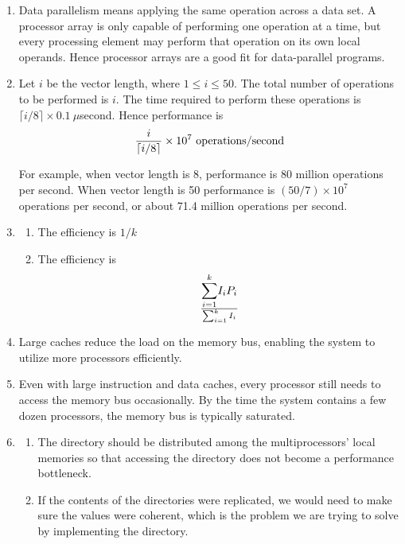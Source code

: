 \begin{enumerate}
\item Data parallelism means applying the same operation across a data set.
      A processor array is only capable of performing one operation at a time,
      but every processing element may perform that operation on its own
      local operands. Hence processor arrays are a good fit for 
      data-parallel programs.

\item Let $i$ be the vector length, where $1 \le i \le 50$.
      The total number of operations to be performed is $i$.
      The time required to perform these operations is
      $\lceil i/8\rceil\times 0.1\ \mu$second.
      Hence performance is
      $${{i}\over{\lceil i/8\rceil}}\times 10^7\ {\rm operations/second}$$

      For example, when vector length is 8, performance is
      80 million operations per second.
      When vector length is 50 performance is $(50/7)\times 10^7$ operations
      per second, or about 71.4 million operations per second.

\item \begin{enumerate}
      \item The efficiency is $1/k$
      \item The efficiency is
            $${\sum_{i=1}^k} I_i P_i\over{\sum_{i=1}^k I_i}$$
      \end{enumerate}

\item Large caches reduce the load on the memory bus, enabling the
      system to utilize more processors efficiently.

\item Even with large instruction and data caches, every processor still needs
      to access the memory bus occasionally. By the time the system contains
      a few dozen processors, the memory bus is typically saturated.

\item \begin{enumerate}
      \item The directory should be distributed among the multiprocessors'
            local memories so that accessing the directory does not become
            a performance bottleneck.
      \item If the contents of the directories were replicated, we would
            need to make sure the values were coherent, which is the
            problem we are trying to solve by implementing the directory.
      \end{enumerate}


\end{enumerate}
